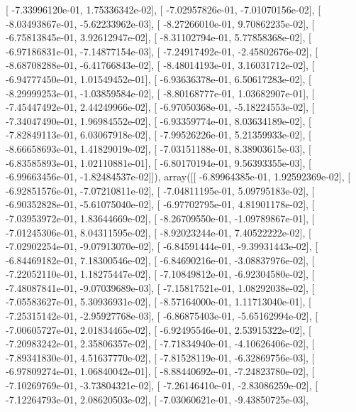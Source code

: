 \documentclass{article}
\begin{document}
       [ -7.33996120e-01,   1.75336342e-02],
       [ -7.02957826e-01,  -7.01070156e-02],
       [ -8.03493867e-01,  -5.62233962e-03],
       [ -8.27266010e-01,   9.70862235e-02],
       [ -6.75813845e-01,   3.92612947e-02],
       [ -8.31102794e-01,   5.77858368e-02],
       [ -6.97186831e-01,  -7.14877154e-03],
       [ -7.24917492e-01,  -2.45802676e-02],
       [ -8.68708288e-01,  -6.41766843e-02],
       [ -8.48014193e-01,   3.16031712e-02],
       [ -6.94777450e-01,   1.01549452e-01],
       [ -6.93636378e-01,   6.50617283e-02],
       [ -8.29999253e-01,  -1.03859584e-02],
       [ -8.80168777e-01,   1.03682907e-01],
       [ -7.45447492e-01,   2.44249966e-02],
       [ -6.97050368e-01,  -5.18224553e-02],
       [ -7.34047490e-01,   1.96984552e-02],
       [ -6.93359774e-01,   8.03634189e-02],
       [ -7.82849113e-01,   6.03067918e-02],
       [ -7.99526226e-01,   5.21359933e-02],
       [ -8.66658693e-01,   1.41829019e-02],
       [ -7.03151188e-01,   8.38903615e-03],
       [ -6.83585893e-01,   1.02110881e-01],
       [ -6.80170194e-01,   9.56393355e-03],
       [ -6.99663456e-01,  -1.82484537e-02]]), array([[ -6.89964385e-01,   1.92592369e-02],
       [ -6.92851576e-01,  -7.07210811e-02],
       [ -7.04811195e-01,   5.09795183e-02],
       [ -6.90352828e-01,  -5.61075040e-02],
       [ -6.97702795e-01,   4.81901178e-02],
       [ -7.03953972e-01,   1.83644669e-02],
       [ -8.26709550e-01,  -1.09789867e-01],
       [ -7.01245306e-01,   8.04311595e-02],
       [ -8.92023244e-01,   7.40522222e-02],
       [ -7.02902254e-01,  -9.07913070e-02],
       [ -6.84591444e-01,  -9.39931443e-02],
       [ -6.84469182e-01,   7.18300546e-02],
       [ -6.84690216e-01,  -3.08837976e-02],
       [ -7.22052110e-01,   1.18275447e-02],
       [ -7.10849812e-01,  -6.92304580e-02],
       [ -7.48087841e-01,  -9.07039689e-03],
       [ -7.15817521e-01,   1.08292038e-02],
       [ -7.05583627e-01,   5.30936931e-02],
       [ -8.57164000e-01,   1.11713040e-01],
       [ -7.25315142e-01,  -2.95927768e-03],
       [ -6.86875403e-01,  -5.65162994e-02],
       [ -7.00605727e-01,   2.01834465e-02],
       [ -6.92495546e-01,   2.53915322e-02],
       [ -7.20983242e-01,   2.35806357e-02],
       [ -7.71834940e-01,  -4.10626406e-02],
       [ -7.89341830e-01,   4.51637770e-02],
       [ -7.81528119e-01,  -6.32869756e-03],
       [ -6.97809274e-01,   1.06840042e-01],
       [ -8.88440692e-01,  -7.24823780e-02],
       [ -7.10269769e-01,  -3.73804321e-02],
       [ -7.26146410e-01,  -2.83086259e-02],
       [ -7.12264793e-01,   2.08620503e-02],
       [ -7.03060621e-01,  -9.43850725e-03],
\end{document}
